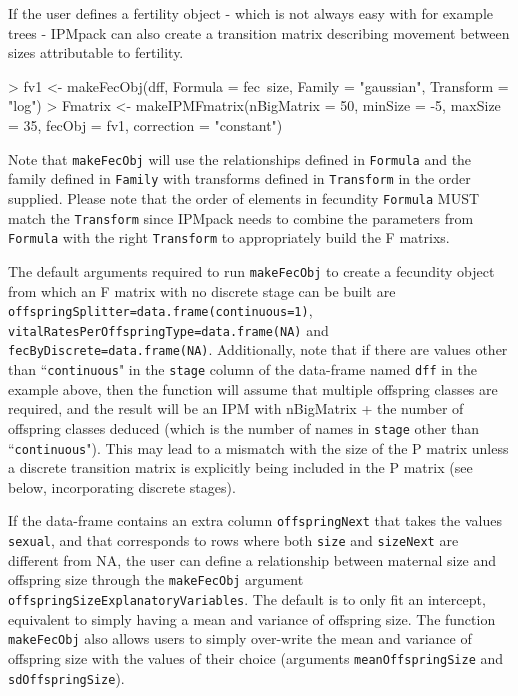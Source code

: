 \documentclass{article}
\begin{document}
If the user defines a fertility object - which is not always easy with for example trees - IPMpack can also create a transition matrix describing movement between sizes attributable to fertility.
\begin{Schunk}
\begin{Sinput}
> fv1 <- makeFecObj(dff, Formula = fec~size, 	
                    Family = "gaussian", 
                    Transform = "log")
> Fmatrix <- makeIPMFmatrix(nBigMatrix = 50, minSize = -5,
                              maxSize = 35, 
                              fecObj = fv1, 
                              correction = "constant")
\end{Sinput}
\end{Schunk}
Note that {\tt makeFecObj} will use the relationships defined in {\tt Formula} and the family defined in {\tt Family} with transforms defined in {\tt Transform} in the order supplied. Please note that the order of elements in fecundity {\tt Formula} MUST match the {\tt Transform} since IPMpack needs to combine the parameters from  {\tt Formula}  with the right  {\tt Transform}  to appropriately build the F matrixs. 

The default arguments required to run {\tt makeFecObj} to create a fecundity
object from which an F matrix with no discrete stage can be built are {\tt
offspringSplitter=data.frame(continuous=1)}, {\tt 
vitalRatesPerOffspringType=data.frame(NA)} and {\tt fecByDiscrete=data.frame(NA)}.
Additionally, note that if there are values other than ``{\tt continuous}" in the {\tt stage} column of the data-frame named {\tt dff} in the example above, then the function will assume that multiple offspring classes are required, and the result will be an IPM with nBigMatrix + the number of offspring classes deduced (which is the number of names in {\tt stage} other than ``{\tt continuous}"). This may lead to a mismatch with the size of the P matrix unless a discrete transition matrix is explicitly being included in the P matrix (see below, incorporating discrete stages).

If the data-frame contains an extra column {\tt offspringNext} that takes the
values {\tt sexual}, and that corresponds to rows where both {\tt size} and {\tt sizeNext} are different from NA, the user can define a relationship between maternal size and offspring size through the {\tt makeFecObj} argument {\tt offspringSizeExplanatoryVariables}. The default is to only fit an intercept, equivalent to simply having a mean and variance of offspring size. The function {\tt makeFecObj} also allows users to simply over-write the mean and variance of offspring size with the values of their choice (arguments {\tt meanOffspringSize} and {\tt sdOffspringSize}).
\end{document}
